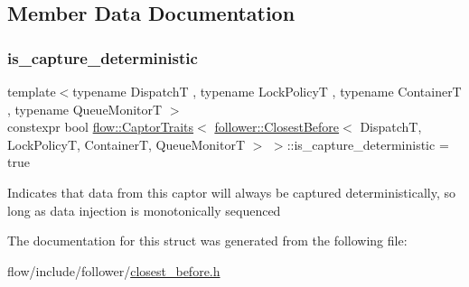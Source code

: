 \subsection{Member Data Documentation}
\mbox{\label{structflow_1_1_captor_traits_3_01follower_1_1_closest_before_3_01_dispatch_t_00_01_lock_policy_t8b834bc2517b16c76af22e1a13353500_a30e638a2c1b9a6c02d59b0817a29ef62}} 
\subsubsection{\texorpdfstring{is\+\_\+capture\+\_\+deterministic}{is\_capture\_deterministic}}
{\footnotesize\ttfamily template$<$typename DispatchT , typename Lock\+PolicyT , typename ContainerT , typename Queue\+MonitorT $>$ \\
constexpr bool \hyperlink{structflow_1_1_captor_traits}{flow\+::\+Captor\+Traits}$<$ \hyperlink{classflow_1_1follower_1_1_closest_before}{follower\+::\+Closest\+Before}$<$ DispatchT, Lock\+PolicyT, ContainerT, Queue\+MonitorT $>$ $>$\+::is\+\_\+capture\+\_\+deterministic = true\hspace{0.3cm}{\ttfamily [static]}}

Indicates that data from this captor will always be captured deterministically, so long as data injection is monotonically sequenced 

The documentation for this struct was generated from the following file\+:\begin{DoxyCompactItemize}
\item 
flow/include/follower/\hyperlink{closest__before_8h}{closest\+\_\+before.\+h}\end{DoxyCompactItemize}
